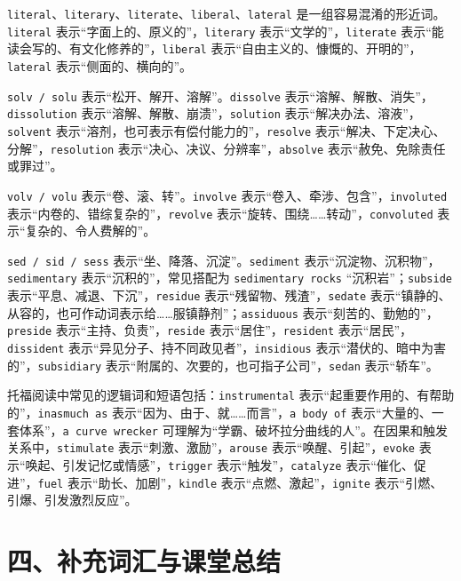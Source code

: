 \documentclass[UTF8,zihao=-4]{ctexart}
\begin{document}
\texttt{literal}、\texttt{literary}、\texttt{literate}、\texttt{liberal}、\texttt{lateral} 是一组容易混淆的形近词。\texttt{literal} 表示“字面上的、原义的”，\texttt{literary} 表示“文学的”，\texttt{literate} 表示“能读会写的、有文化修养的”，\texttt{liberal} 表示“自由主义的、慷慨的、开明的”，\texttt{lateral} 表示“侧面的、横向的”。

\texttt{solv / solu} 表示“松开、解开、溶解”。\texttt{dissolve} 表示“溶解、解散、消失”，\texttt{dissolution} 表示“溶解、解散、崩溃”，\texttt{solution} 表示“解决办法、溶液”，\texttt{solvent} 表示“溶剂，也可表示有偿付能力的”，\texttt{resolve} 表示“解决、下定决心、分解”，\texttt{resolution} 表示“决心、决议、分辨率”，\texttt{absolve} 表示“赦免、免除责任或罪过”。

\texttt{volv / volu} 表示“卷、滚、转”。\texttt{involve} 表示“卷入、牵涉、包含”，\texttt{involuted} 表示“内卷的、错综复杂的”，\texttt{revolve} 表示“旋转、围绕……转动”，\texttt{convoluted} 表示“复杂的、令人费解的”。

\texttt{sed / sid / sess} 表示“坐、降落、沉淀”。\texttt{sediment} 表示“沉淀物、沉积物”，\texttt{sedimentary} 表示“沉积的”，常见搭配为 \texttt{sedimentary rocks} “沉积岩”；\texttt{subside} 表示“平息、减退、下沉”，\texttt{residue} 表示“残留物、残渣”，\texttt{sedate} 表示“镇静的、从容的，也可作动词表示给……服镇静剂”；\texttt{assiduous} 表示“刻苦的、勤勉的”，\texttt{preside} 表示“主持、负责”，\texttt{reside} 表示“居住”，\texttt{resident} 表示“居民”，\texttt{dissident} 表示“异见分子、持不同政见者”，\texttt{insidious} 表示“潜伏的、暗中为害的”，\texttt{subsidiary} 表示“附属的、次要的，也可指子公司”，\texttt{sedan} 表示“轿车”。

托福阅读中常见的逻辑词和短语包括：\texttt{instrumental} 表示“起重要作用的、有帮助的”，\texttt{inasmuch as} 表示“因为、由于、就……而言”，\texttt{a body of} 表示“大量的、一套体系”，\texttt{a curve wrecker} 可理解为“学霸、破坏拉分曲线的人”。在因果和触发关系中，\texttt{stimulate} 表示“刺激、激励”，\texttt{arouse} 表示“唤醒、引起”，\texttt{evoke} 表示“唤起、引发记忆或情感”，\texttt{trigger} 表示“触发”，\texttt{catalyze} 表示“催化、促进”，\texttt{fuel} 表示“助长、加剧”，\texttt{kindle} 表示“点燃、激起”，\texttt{ignite} 表示“引燃、引爆、引发激烈反应”。

\section*{四、补充词汇与课堂总结}
\end{document}
